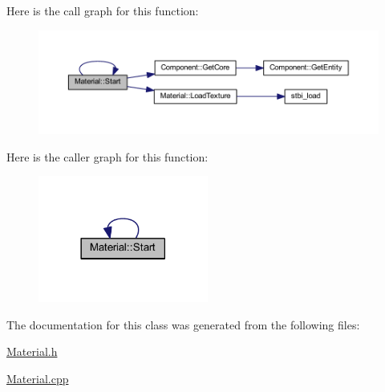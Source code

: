 Here is the call graph for this function\+:
\nopagebreak
\begin{figure}[H]
\begin{center}
\leavevmode
\includegraphics[width=350pt]{class_material_a8fcc1a8e83981ddd45c746c7ca98e46c_cgraph}
\end{center}
\end{figure}
Here is the caller graph for this function\+:
\nopagebreak
\begin{figure}[H]
\begin{center}
\leavevmode
\includegraphics[width=158pt]{class_material_a8fcc1a8e83981ddd45c746c7ca98e46c_icgraph}
\end{center}
\end{figure}


The documentation for this class was generated from the following files\+:\begin{DoxyCompactItemize}
\item 
\mbox{\hyperlink{_material_8h}{Material.\+h}}\item 
\mbox{\hyperlink{_material_8cpp}{Material.\+cpp}}\end{DoxyCompactItemize}
